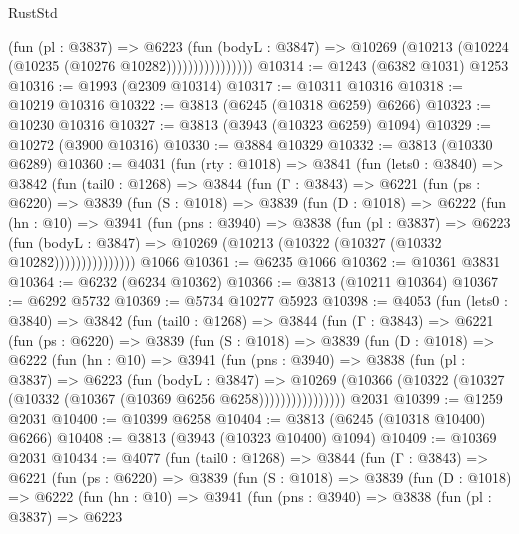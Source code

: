 \begin{lexlean}{RustStd}
\begin{coremodule}
                        (fun (pl : @3837) =>
                        @6223
                          (fun (bodyL : @3847) =>
                          @10269 (@10213 (@10224 (@10235 (@10276 @10282))))))))))))))))
@10314 := @1243 (@6382 @1031) @1253
@10316 := @1993 (@2309 @10314)
@10317 := @10311 @10316
@10318 := @10219 @10316
@10322 := @3813 (@6245 (@10318 @6259) @6266)
@10323 := @10230 @10316
@10327 := @3813 (@3943 (@10323 @6259) @1094)
@10329 := @10272 (@3900 @10316)
@10330 := @3884 @10329
@10332 := @3813 (@10330 @6289)
@10360 := @4031
    (fun (rty : @1018) =>
    @3841
      (fun (lets0 : @3840) =>
      @3842
        (fun (tail0 : @1268) =>
        @3844
          (fun (Γ : @3843) =>
          @6221
            (fun (ps : @6220) =>
            @3839
              (fun (S : @1018) =>
              @3839
                (fun (D : @1018) =>
                @6222
                  (fun (hn : @10) =>
                  @3941
                    (fun (pns : @3940) =>
                    @3838
                      (fun (pl : @3837) =>
                      @6223
                        (fun (bodyL : @3847) =>
                        @10269 (@10213 (@10322 (@10327 (@10332 @10282)))))))))))))))
    @1066
@10361 := @6235 @1066
@10362 := @10361 @3831
@10364 := @6232 (@6234 @10362)
@10366 := @3813 (@10211 @10364)
@10367 := @6292 @5732
@10369 := @5734 @10277 @5923
@10398 := @4053
    (fun (lets0 : @3840) =>
    @3842
      (fun (tail0 : @1268) =>
      @3844
        (fun (Γ : @3843) =>
        @6221
          (fun (ps : @6220) =>
          @3839
            (fun (S : @1018) =>
            @3839
              (fun (D : @1018) =>
              @6222
                (fun (hn : @10) =>
                @3941
                  (fun (pns : @3940) =>
                  @3838
                    (fun (pl : @3837) =>
                    @6223
                      (fun (bodyL : @3847) =>
                      @10269
                        (@10366 (@10322 (@10327 (@10332 (@10367 (@10369 @6256 @6258))))))))))))))))
    @2031
@10399 := @1259 @2031
@10400 := @10399 @6258
@10404 := @3813 (@6245 (@10318 @10400) @6266)
@10408 := @3813 (@3943 (@10323 @10400) @1094)
@10409 := @10369 @2031
@10434 := @4077
    (fun (tail0 : @1268) =>
    @3844
      (fun (Γ : @3843) =>
      @6221
        (fun (ps : @6220) =>
        @3839
          (fun (S : @1018) =>
          @3839
            (fun (D : @1018) =>
            @6222
              (fun (hn : @10) =>
              @3941
                (fun (pns : @3940) =>
                @3838
                  (fun (pl : @3837) =>
                  @6223

\end{coremodule}
\end{lexlean}
